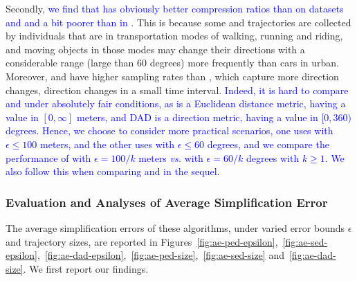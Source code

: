Secondly, \textcolor{blue}{we find that \sed has obviously better compression ratios than \dad on datasets \geolife and \mopsi and a bit poorer than \dad in \ucar.}
This is because some \geolife and \mopsi trajectories are collected by individuals that are in transportation modes of walking, running and riding, and moving objects in those modes may change their directions with a considerable range (\eg large than $60$ degrees) more frequently than cars in urban. Moreover, \geolife and \mopsi have higher sampling rates than \ucar, which capture more direction changes, \ie direction changes in a small time interval.
%
\textcolor{blue}{Indeed, it is hard to compare \sed and \dad under absolutely fair conditions, as \sed is a Euclidean distance metric, having a value in $[0, \infty]$ meters, and DAD is a direction metric,  having a value in $[0,360)$ degrees. Hence, we choose to consider more practical scenarios, \ie one uses \sed with $\epsilon  \le  100$ meters, and the other uses \dad with $\epsilon \le 60$ degrees, and we compare the performance of \sed with $\epsilon=100/k$ meters \emph{vs.} \dad with $\epsilon=60/k$ degrees with $k \ge 1$. We also follow this when comparing \sed and \dad in the sequel.}







\subsubsection{Evaluation and Analyses of Average Simplification Error}
\label{sec-ae}
The average simplification errors of these algorithms, under varied error bounds $\epsilon$ and trajectory sizes, are reported in Figures~\ref{fig:ae-ped-epsilon},~\ref{fig:ae-sed-epsilon},~\ref{fig:ae-dad-epsilon},~\ref{fig:ae-ped-size},~\ref{fig:ae-sed-size} and~\ref{fig:ae-dad-size}.
We first report our findings.



